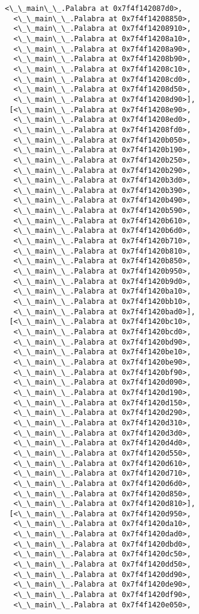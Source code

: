 \documentclass[12pt,a4paper,table]{article}
\begin{document}
\begin{tcolorbox}[breakable, size=fbox, boxrule=.5pt, pad at break*=1mm, opacityfill=0]
\begin{Verbatim}[commandchars=\\\{\}]
  <\_\_main\_\_.Palabra at 0x7f4f142087d0>,
  <\_\_main\_\_.Palabra at 0x7f4f14208850>,
  <\_\_main\_\_.Palabra at 0x7f4f14208910>,
  <\_\_main\_\_.Palabra at 0x7f4f14208a10>,
  <\_\_main\_\_.Palabra at 0x7f4f14208a90>,
  <\_\_main\_\_.Palabra at 0x7f4f14208b90>,
  <\_\_main\_\_.Palabra at 0x7f4f14208c10>,
  <\_\_main\_\_.Palabra at 0x7f4f14208cd0>,
  <\_\_main\_\_.Palabra at 0x7f4f14208d50>,
  <\_\_main\_\_.Palabra at 0x7f4f14208d90>],
 [<\_\_main\_\_.Palabra at 0x7f4f14208e90>,
  <\_\_main\_\_.Palabra at 0x7f4f14208ed0>,
  <\_\_main\_\_.Palabra at 0x7f4f14208fd0>,
  <\_\_main\_\_.Palabra at 0x7f4f1420b050>,
  <\_\_main\_\_.Palabra at 0x7f4f1420b190>,
  <\_\_main\_\_.Palabra at 0x7f4f1420b250>,
  <\_\_main\_\_.Palabra at 0x7f4f1420b290>,
  <\_\_main\_\_.Palabra at 0x7f4f1420b3d0>,
  <\_\_main\_\_.Palabra at 0x7f4f1420b390>,
  <\_\_main\_\_.Palabra at 0x7f4f1420b490>,
  <\_\_main\_\_.Palabra at 0x7f4f1420b590>,
  <\_\_main\_\_.Palabra at 0x7f4f1420b610>,
  <\_\_main\_\_.Palabra at 0x7f4f1420b6d0>,
  <\_\_main\_\_.Palabra at 0x7f4f1420b710>,
  <\_\_main\_\_.Palabra at 0x7f4f1420b810>,
  <\_\_main\_\_.Palabra at 0x7f4f1420b850>,
  <\_\_main\_\_.Palabra at 0x7f4f1420b950>,
  <\_\_main\_\_.Palabra at 0x7f4f1420b9d0>,
  <\_\_main\_\_.Palabra at 0x7f4f1420ba10>,
  <\_\_main\_\_.Palabra at 0x7f4f1420bb10>,
  <\_\_main\_\_.Palabra at 0x7f4f1420bad0>],
 [<\_\_main\_\_.Palabra at 0x7f4f1420bc10>,
  <\_\_main\_\_.Palabra at 0x7f4f1420bcd0>,
  <\_\_main\_\_.Palabra at 0x7f4f1420bd90>,
  <\_\_main\_\_.Palabra at 0x7f4f1420be10>,
  <\_\_main\_\_.Palabra at 0x7f4f1420be90>,
  <\_\_main\_\_.Palabra at 0x7f4f1420bf90>,
  <\_\_main\_\_.Palabra at 0x7f4f1420d090>,
  <\_\_main\_\_.Palabra at 0x7f4f1420d190>,
  <\_\_main\_\_.Palabra at 0x7f4f1420d150>,
  <\_\_main\_\_.Palabra at 0x7f4f1420d290>,
  <\_\_main\_\_.Palabra at 0x7f4f1420d310>,
  <\_\_main\_\_.Palabra at 0x7f4f1420d3d0>,
  <\_\_main\_\_.Palabra at 0x7f4f1420d4d0>,
  <\_\_main\_\_.Palabra at 0x7f4f1420d550>,
  <\_\_main\_\_.Palabra at 0x7f4f1420d610>,
  <\_\_main\_\_.Palabra at 0x7f4f1420d710>,
  <\_\_main\_\_.Palabra at 0x7f4f1420d6d0>,
  <\_\_main\_\_.Palabra at 0x7f4f1420d850>,
  <\_\_main\_\_.Palabra at 0x7f4f1420d810>],
 [<\_\_main\_\_.Palabra at 0x7f4f1420d950>,
  <\_\_main\_\_.Palabra at 0x7f4f1420da10>,
  <\_\_main\_\_.Palabra at 0x7f4f1420dad0>,
  <\_\_main\_\_.Palabra at 0x7f4f1420dbd0>,
  <\_\_main\_\_.Palabra at 0x7f4f1420dc50>,
  <\_\_main\_\_.Palabra at 0x7f4f1420dd50>,
  <\_\_main\_\_.Palabra at 0x7f4f1420dd90>,
  <\_\_main\_\_.Palabra at 0x7f4f1420de90>,
  <\_\_main\_\_.Palabra at 0x7f4f1420df90>,
  <\_\_main\_\_.Palabra at 0x7f4f1420e050>,

\end{Verbatim}
\end{tcolorbox}
\end{document}
